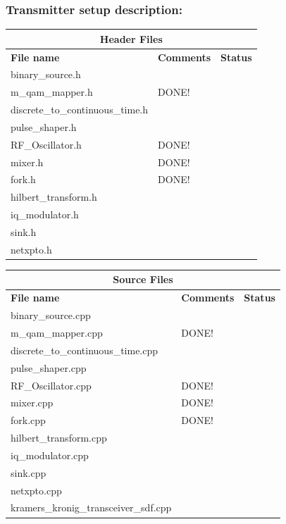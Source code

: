 \subsubsection{Transmitter setup description:}
\begin{center}
	\begin{tabular}{ |p{6cm}||p{7cm}|p{1cm}|   }
		\hline
		\multicolumn{3}{|c|}{\textbf{Header Files}} \\
		\hline
		\textbf{File name} & \textbf{Comments}&\textbf{Status}\\
		\hline
		binary\_source.h    				&  &\checkmark\\
		\hline
		m\_qam\_mapper.h 					& DONE! &\checkmark\\
		\hline
		discrete\_to\_continuous\_time.h    &  		&\checkmark\\
		\hline
		pulse\_shaper.h 					& 		&\checkmark\\
		\hline
		RF\_Oscillator.h					& DONE! &\checkmark\\
		\hline
		mixer.h		 						& DONE! &\checkmark\\
		\hline
		fork.h								& DONE! &\checkmark\\
		\hline
		hilbert\_transform.h				&  &\\
		\hline
		iq\_modulator.h						&  &\checkmark\\
		\hline
		sink.h								&  &\checkmark\\
		\hline
		netxpto.h							&  &\checkmark\\
		\hline
	\end{tabular}
\end{center}
\vspace{0.4cm}
\begin{center}
	\begin{tabular}{ |p{6cm}||p{7cm}|p{1cm}|   }
		\hline
		\multicolumn{3}{|c|}{\textbf{Source Files}} \\
		\hline
		\textbf{File name} & \textbf{Comments}&\textbf{Status}\\
		\hline
		binary\_source.cpp    				&  &\checkmark\\
		\hline
		m\_qam\_mapper.cpp 					& DONE! &\checkmark\\
		\hline
		discrete\_to\_continuous\_time.cpp  &  &\checkmark\\
		\hline
		pulse\_shaper.cpp 					&  &\checkmark\\
		\hline
		RF\_Oscillator.cpp					& DONE! &\checkmark\\
		\hline
		mixer.cpp		 					& DONE! &\checkmark\\
		\hline
		fork.cpp							& DONE! &\checkmark\\
		\hline
		hilbert\_transform.cpp				&  &\\
		\hline
		iq\_modulator.cpp					&  &\checkmark\\
		\hline
		sink.cpp							&  &\checkmark\\
		\hline
		netxpto.cpp							&  &\checkmark\\
		\hline
		kramers\_kronig\_transceiver\_sdf.cpp  &  &\checkmark\\
		\hline
	\end{tabular}
\end{center}
\newpage
